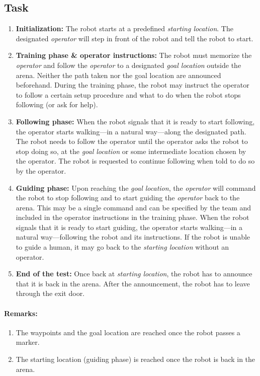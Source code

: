 \subsection{Task}

\begin{enumerate}
\item \textbf{Initialization:} The robot starts at a predefined \emph{starting location}. 
  The designated \textit{operator} will step in front of the robot and tell the robot to start. 
\item \textbf{Training phase \& operator instructions:} The robot must memorize the \textit{operator} and follow the \emph{operator} to a designated \emph{goal location} outside the arena. 
  Neither the path taken nor the goal location are announced beforehand.
  During the training phase, the robot may instruct the operator to follow a certain setup procedure and what to do when the robot stops following (or ask for help).
\item \textbf{Following phase:} When the robot signals that it is ready to start following, the operator starts walking---in a natural way---along the designated path. 
  The robot needs to follow the operator until the operator asks the robot to stop doing so, at the \textit{goal location} or some intermediate location chosen by the operator.
  The robot is requested to continue following when told to do so by the operator.
\item \textbf{Guiding phase:} Upon reaching the \textit{goal location}, the \textit{operator} will command the robot to stop following and to start guiding the \emph{operator} back to the arena.
  This may be a single command and can be specified by the team and included in the operator instructions in the training phase.
  When the robot signals that it is ready to start guiding, the operator starts walking---in a natural way---following the robot and its instructions.
  If the robot is unable to guide a human, it may go back to the \textit{starting location} without an operator. 
\item \textbf{End of the test:} Once back at \textit{starting location}, the robot has to announce that it is back in the arena. 
  After the announcement, the robot has to leave through the exit door.
\end{enumerate}

\paragraph*{Remarks:}
\begin{enumerate}
\item The waypoints and the goal location are reached once the robot passes a marker.
\item The starting location (guiding phase) is reached once the robot is back in the arena.
\end{enumerate}

